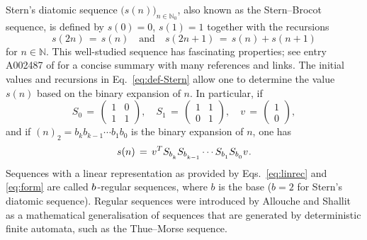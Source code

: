 \documentclass[11pt,a4paper]{amsart}
\theoremstyle{plain}
\theoremstyle{definition}
\numberwithin{equation}{section}
\newcommand{\ts}{\hspace{0.5pt}}
\newcommand{\NN}{\mathbb{N}}
\begin{document}
Stern's diatomic sequence $\bigl( s(n) \bigr)_{n\in\NN_0}$, also known
as the Stern--Brocot sequence, is defined by $s(0)=0$, $s(1)=1$
together with the recursions
\begin{equation}\label{eq:def-Stern}
   s(2n) \, = \, s(n)
   \quad \text{and} \quad
   s(2n+1) \, = \, s(n) + s(n+1)
\end{equation}
for $n \in \NN$. This well-studied sequence has fascinating
properties; see entry \textsf{A{\ts}002487} of \cite{oeis} for a
concise summary with many references and links. The initial values and
recursions in Eq.~\eqref{eq:def-Stern} allow one to determine the value
$s(n)$ based on the binary expansion of $n$. In particular, if
\begin{equation}\label{eq:linrec} 
   {S}^{}_0 \, = \,\left(\begin{matrix} 1& 0\\ 
    1& 1\end{matrix}\right),\quad 
   {S}^{}_1 \, = \, \left(\begin{matrix} 1& 1\\ 
   0& 1\end{matrix}\right),\quad {v} \, = \,
   \left(\begin{matrix}1 \\ 0\end{matrix}\right),
\end{equation} 
and if $(n)^{}_2=b^{}_k b^{}_{k-1} \cdots b^{}_1 b^{}_0$ is the binary
expansion of $n$, one has
\begin{equation}\label{eq:form}
  s(n) \, = \, {v}^{T} {S}_{b^{}_k} {S}_{b^{}_{k-1}} \cdots
     {S}_{b^{}_1} {S}_{b^{}_0} {v} \ts .
\end{equation}
Sequences with a linear representation as provided by
Eqs.~\eqref{eq:linrec} and \eqref{eq:form} are called
\mbox{$b\ts$-regular} sequences, where $b$ is the base ($b=2$ for
Stern's diatomic sequence). Regular sequences were introduced by
Allouche and Shallit \cite{AS1992} as a mathematical generalisation of
sequences that are generated by deterministic finite automata, such as
the Thue--Morse sequence.
\end{document}
